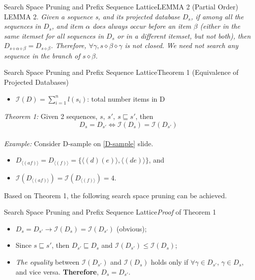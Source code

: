 \documentclass[12pt]{beamer}
\begin{document}
\begin{frame}{Search Space Pruning and Prefix Sequence Lattice}{LEMMA 2 (Partial Order)}
LEMMA 2. {\it Given a sequence s, and its projected database $D_s$, if among all the sequences in $D_s$, and item $\alpha$ does always occur before an item $\beta$ (either in the same itemset for all sequences in $D_s$ or in a different itemset, but not both), then $D_{s\diamond\alpha\diamond\beta} = D_{s\diamond\beta}$. Therefore, $\forall\gamma,s\diamond\beta\diamond\gamma$ is not closed. We need not search any sequence in the branch of $s \diamond \beta$.}\\
\end{frame}

\begin{frame}{Search Space Pruning and Prefix Sequence Lattice}{Theorem 1 (Equivalence of Projected Databases)}
\begin{itemize}
	\item $\mathcal{I}(D) = \sum\limits_{i=1}^n l(s_i)$: total number items in D
\end{itemize}
{\it Theorem 1:} Given 2 sequences, $s,~s',~s \sqsubseteq s'$, then $$D_s = D_{s'} \Leftrightarrow \mathcal{I}(D_s) = \mathcal{I}(D_{s'})$$\\
{\it Example:} Consider D-sample on \ref{D-sample} slide.
\begin{itemize}
\item $D_{\langle (af) \rangle} = D_{\langle (f) \rangle} = \{ \langle (d)(e) \rangle,\langle (de) \rangle \}$, and
\item  $\mathcal{I}(D_{ \langle (af) \rangle }) = \mathcal{I}(D_{\langle (f) \rangle}) = 4$.
\end{itemize}
Based on Theorem 1, the following search space pruning can be achieved.
\end{frame}

\begin{frame}{Search Space Pruning and Prefix Sequence Lattice}{{\it Proof} of Theorem 1}
\begin{itemize}
\item $D_s = D_{s'} \rightarrow \mathcal{I}(D_s) = \mathcal{I}(D_{s'})$ (obvious);
\item Since $s \sqsubseteq s'$, then $D_{s'} \sqsubseteq D_s$ and $\mathcal{I}(D_{s'}) \leq \mathcal{I}(D_s)$;
\item {\it The equality} between  $\mathcal{I}(D_{s'})$ and $\mathcal{I}(D_s)$ holds only if $\forall\gamma \in D_{s'}$, $\gamma \in D_s$, and vice versa. {\bf Therefore}, $D_s = D_{s'}$.
\end{itemize}
\end{frame}
\end{document}
